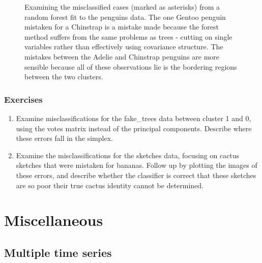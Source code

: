 \documentclass[
  letterpaper,
]{book}
\providecommand{\tightlist}{%
  \setlength{\itemsep}{0pt}\setlength{\parskip}{0pt}}\usepackage{longtable,booktabs,array}
\begin{document}
\begin{figure}

\begin{minipage}[t]{0.50\linewidth}

{\centering 

}

\end{minipage}%

\caption{\label{fig-p-errors}Examining the misclassified cases (marked
as asterisks) from a random forest fit to the penguins data. The one
Gentoo penguin mistaken for a Chinstrap is a mistake made because the
forest method suffers from the same problems as trees - cutting on
single variables rather than effectively using covariance structure. The
mistakes between the Adelie and Chinstrap penguins are more sensible
because all of these observations lie is the bordering regions between
the two clusters.}

\end{figure}

\hypertarget{exercises-13}{%
\section*{Exercises}\label{exercises-13}}


\begin{enumerate}
\def\labelenumi{\arabic{enumi}.}
\tightlist
\item
  Examine misclassifications for the fake\_trees data between cluster 1
  and 0, using the votes matrix instead of the principal components.
  Describe where these errors fall in the simplex.
\item
  Examine the misclassifications for the sketches data, focusing on
  cactus sketches that were mistaken for bananas. Follow up by plotting
  the images of these errors, and describe whether the classifier is
  correct that these sketches are so poor their true cactus identity
  cannot be determined.
\end{enumerate}

\part{Miscellaneous}

\hypertarget{multiple-time-series}{%
\chapter{Multiple time series}\label{multiple-time-series}}
\end{document}
